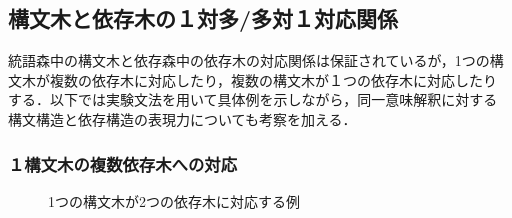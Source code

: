 \begin{comment}
====== Number of various trees ========
[Parse Forest]
(a) Parse Forest Size : 23
(b) Number of collection of parse trees : 10
(c) Number of set of parse trees : 8
[Dependency Forest]
(I-1) Initial DF size : 24
(I-2) Initial DF ID-tree collection number : 10
(I-3) Initial DF ID-tree set number : 10
(I-4) Initial DF Generalized-tree number : 10
(R-1) Reduced DF size : 16
(R-2) Reduced DF ID-tree collection number : 10
(R-3) Reduced DF ID-tree set number : 10
(R-4) Reduced DF Generalized-tree number : 10

\end{comment}

\subsection{構文木と依存木の１対多/多対１対応関係}

統語森中の構文木と依存森中の依存木の対応関係は保証されているが，1つの構
文木が複数の依存木に対応したり，複数の構文木が１つの依存木に対応したり
する．以下では実験文法を用いて具体例を示しながら，同一意味解釈に対する
構文構造と依存構造の表現力についても考察を加える．

\subsubsection{１構文木の複数依存木への対応}

\begin{figure}[b]
\begin{center}
\end{center}
\myfiglabelskip
\caption{1つの構文木が2つの依存木に対応する例}
\label{fig:MapFromOnePTToTwoDTs}
\end{figure}


